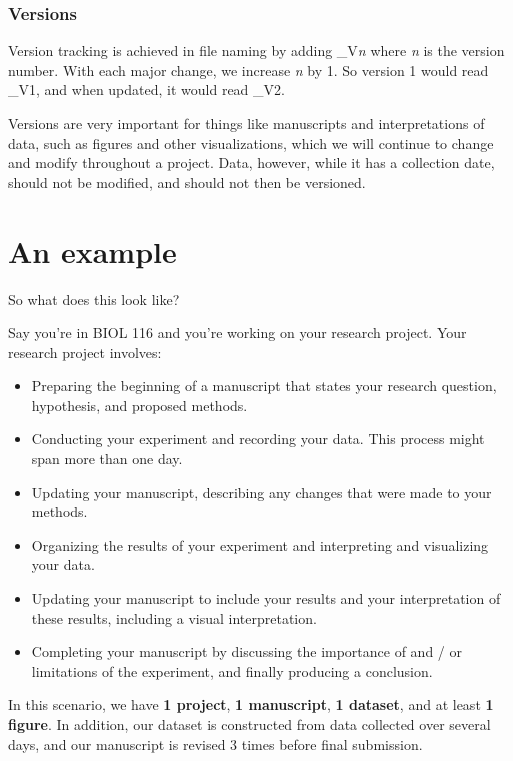 \documentclass[
]{book}
\providecommand{\tightlist}{%
  \setlength{\itemsep}{0pt}\setlength{\parskip}{0pt}}
\begin{document}
\subsubsection*{Versions}\label{versions}

Version tracking is achieved in file naming by adding \_V\emph{n} where \emph{n} is the version number. With each major change, we increase \emph{n} by 1. So version 1 would read \_V1, and when updated, it would read \_V2.

Versions are very important for things like manuscripts and interpretations of data, such as figures and other visualizations, which we will continue to change and modify throughout a project. Data, however, while it has a collection date, should not be modified, and should not then be versioned.

\section{An example}\label{an-example}

So what does this look like?

Say you're in BIOL 116 and you're working on your research project. Your research project involves:

\begin{itemize}
\tightlist
\item
  Preparing the beginning of a manuscript that states your research question, hypothesis, and proposed methods.
\item
  Conducting your experiment and recording your data. This process might span more than one day.
\item
  Updating your manuscript, describing any changes that were made to your methods.
\item
  Organizing the results of your experiment and interpreting and visualizing your data.
\item
  Updating your manuscript to include your results and your interpretation of these results, including a visual interpretation.
\item
  Completing your manuscript by discussing the importance of and / or limitations of the experiment, and finally producing a conclusion.
\end{itemize}

In this scenario, we have \textbf{1 project}, \textbf{1 manuscript}, \textbf{1 dataset}, and at least \textbf{1 figure}. In addition, our dataset is constructed from data collected over several days, and our manuscript is revised 3 times before final submission.
\end{document}
